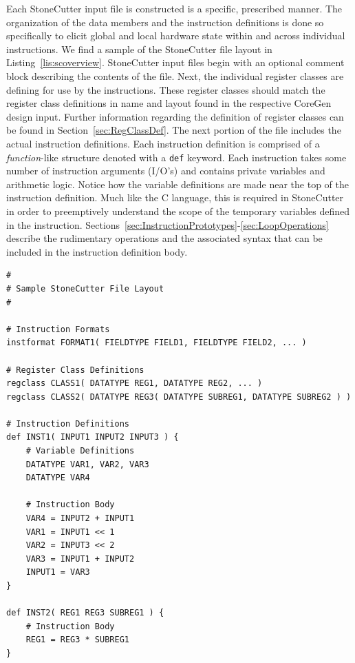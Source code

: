 \documentclass{article}
\begin{document}
Each StoneCutter input file is constructed is a specific, prescribed manner.  The organization of the data members and 
the instruction definitions is done so specifically to elicit global and local hardware state within and across individual instructions.  
We find a sample of the StoneCutter file layout in Listing~\ref{lis:scoverview}.  
StoneCutter input files begin with an optional comment block describing the contents of the file.  Next, the individual register 
classes are defining for use by the instructions.  These register classes should match the register class definitions in name and 
layout found in the respective CoreGen design input.  Further information regarding the definition of register classes can 
be found in Section~\ref{sec:RegClassDef}.  The next portion of the file includes the actual instruction definitions.  Each 
instruction definition is comprised of a \textit{function}-like structure denoted with a \texttt{def} keyword.  Each instruction 
takes some number of instruction arguments (I/O's) and contains private variables and arithmetic logic.  Notice how 
the variable definitions are made near the top of the instruction definition.  Much like the C language, this is required 
in StoneCutter in order to preemptively understand the scope of the temporary variables defined in the instruction.  
Sections~\ref{sec:InstructionPrototypes}-\ref{sec:LoopOperations} 
describe the rudimentary operations and the associated syntax that can be included in the instruction 
definition body.  

\clearpage
\vspace{0.125in}
\begin{lstlisting}[frame=single,style=base,caption={StoneCutter File Structure},captionpos=b,label={lis:scoverview}]
#
# Sample StoneCutter File Layout
#

# Instruction Formats
instformat FORMAT1( FIELDTYPE FIELD1, FIELDTYPE FIELD2, ... )

# Register Class Definitions
regclass CLASS1( DATATYPE REG1, DATATYPE REG2, ... )
regclass CLASS2( DATATYPE REG3( DATATYPE SUBREG1, DATATYPE SUBREG2 ) )

# Instruction Definitions
def INST1( INPUT1 INPUT2 INPUT3 ) {
	# Variable Definitions
	DATATYPE VAR1, VAR2, VAR3
	DATATYPE VAR4
	
	# Instruction Body
	VAR4 = INPUT2 + INPUT1
	VAR1 = INPUT1 << 1
	VAR2 = INPUT3 << 2
	VAR3 = INPUT1 + INPUT2
	INPUT1 = VAR3
}

def INST2( REG1 REG3 SUBREG1 ) {
	# Instruction Body
	REG1 = REG3 * SUBREG1
}
\end{lstlisting}
\end{document}

